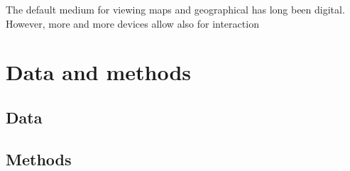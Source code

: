 \documentclass{article}
\begin{document}
The default medium for viewing maps and geographical has long been digital.  %
However, more and more devices allow also for interaction \parencite{mei2019}



\section{Data and methods}

\subsection{Data}

\subsection{Methods}

\printbibliography
\end{document}
